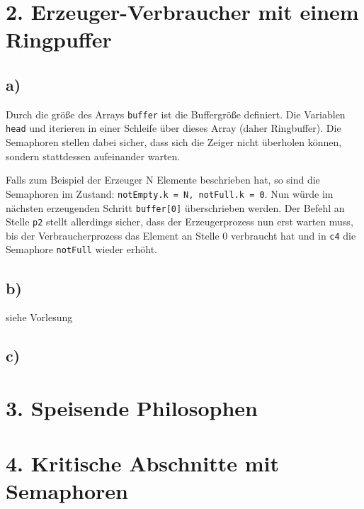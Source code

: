 \section*{2. Erzeuger-Verbraucher mit einem Ringpuffer}
\subsection*{a)}
Durch die größe des Arrays \texttt{buffer} ist die Buffergröße definiert. Die Variablen \texttt{head} und  iterieren in einer Schleife über dieses Array (daher Ringbuffer). Die Semaphoren stellen dabei sicher, dass sich die Zeiger nicht überholen können, sondern stattdessen aufeinander warten.

Falls zum Beispiel der Erzeuger N Elemente beschrieben hat, so sind die Semaphoren im Zustand: \texttt{notEmpty.k = N, notFull.k = 0}. Nun würde im nächsten erzeugenden Schritt \texttt{buffer[0]} überschrieben werden. Der Befehl an Stelle \texttt{p2} stellt allerdings sicher, dass der Erzeugerprozess nun erst warten muss, bis der Verbraucherprozess das Element an Stelle 0 verbraucht hat und in \texttt{c4} die Semaphore \texttt{notFull} wieder erhöht.

\subsection*{b)}
siehe Vorlesung

\subsection*{c)}


\section*{3. Speisende Philosophen}
\section*{4. Kritische Abschnitte mit Semaphoren}


